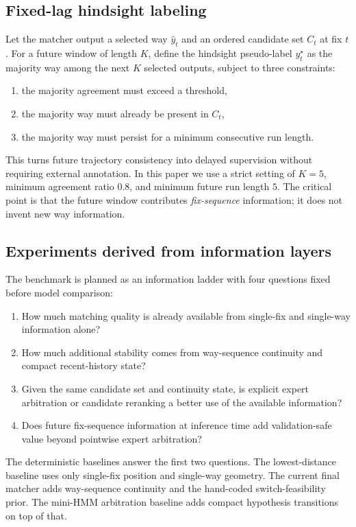 \documentclass{article}
\begin{document}
\subsection{Fixed-lag hindsight labeling}
Let the matcher output a selected way \(\hat{y}_t\) and an ordered candidate set \(C_t\) at fix \(t\). For a future window of length \(K\), define the hindsight pseudo-label \(y_t^\star\) as the majority way among the next \(K\) selected outputs, subject to three constraints:
\begin{enumerate}[leftmargin=*,itemsep=2pt]
\item the majority agreement must exceed a threshold,
\item the majority way must already be present in \(C_t\),
\item the majority way must persist for a minimum consecutive run length.
\end{enumerate}
This turns future trajectory consistency into delayed supervision without requiring external annotation. In this paper we use a strict setting of \(K=5\), minimum agreement ratio \(0.8\), and minimum future run length \(5\). The critical point is that the future window contributes \emph{fix-sequence} information; it does not invent new way information.

\subsection{Experiments derived from information layers}
The benchmark is planned as an information ladder with four questions fixed before model comparison:
\begin{enumerate}[leftmargin=*,itemsep=2pt]
\item How much matching quality is already available from single-fix and single-way information alone?
\item How much additional stability comes from way-sequence continuity and compact recent-history state?
\item Given the same candidate set and continuity state, is explicit expert arbitration or candidate reranking a better use of the available information?
\item Does future fix-sequence information at inference time add validation-safe value beyond pointwise expert arbitration?
\end{enumerate}

The deterministic baselines answer the first two questions. The lowest-distance baseline uses only single-fix position and single-way geometry. The current final matcher adds way-sequence continuity and the hand-coded switch-feasibility prior. The mini-HMM arbitration baseline adds compact hypothesis transitions on top of that.
\end{document}
